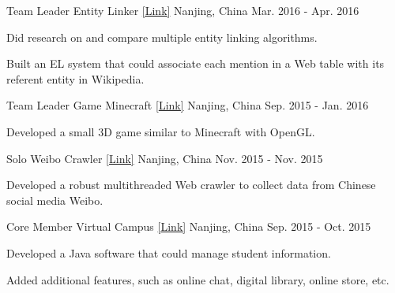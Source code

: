 \begin{cventries}
  \cventry
    {Team Leader} %
    {Entity Linker \href{https://github.com/acmom/entity-linker}{[\underline{Link}]}} %
    {Nanjing, China} %
    {Mar. 2016 - Apr. 2016} %
    {
      \begin{cvitems} %
        \item {Did research on and compare multiple entity linking algorithms.}
        \item {Built an EL system that could associate each mention in a Web table with its referent entity in Wikipedia.}
      \end{cvitems}
    }

  \cventry
    {Team Leader} %
    {Game Minecraft \href{https://github.com/yanshengjia/openGL/tree/master/lab5(final)}{[\underline{Link}]}} %
    {Nanjing, China} %
    {Sep. 2015 - Jan. 2016} %
    {
      \begin{cvitems} %
        \item {Developed a small 3D game similar to Minecraft with OpenGL.}
      \end{cvitems}
    }

  \cventry
    {Solo} %
    {Weibo Crawler \href{https://github.com/yanshengjia/crawler/tree/master/weiboCrawler}{[\underline{Link}]}} %
    {Nanjing, China} %
    {Nov. 2015 - Nov. 2015} %
    {
      \begin{cvitems} %
        \item {Developed a robust multithreaded Web crawler to collect data from Chinese social media Weibo.}
      \end{cvitems}
    }

  \cventry
    {Core Member} %
    {Virtual Campus \href{https://github.com/acmom/vcampus}{[\underline{Link}]}} %
    {Nanjing, China} %
    {Sep. 2015 - Oct. 2015} %
    {
      \begin{cvitems} %
        \item {Developed a Java software that could manage student information.}
        \item {Added additional features, such as online chat, digital library, online store, etc.}
      \end{cvitems}
    }

\end{cventries}
